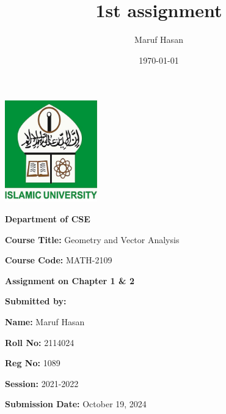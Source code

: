 \documentclass{article}
\title{1st assignment}
\author{Maruf Hasan}
\date{\today}
\begin{document}
\begin{titlepage}
    
    \begin{center}
        \vspace{2cm}
        \includegraphics[width=0.3\textwidth]{IU logo.jpg}\par
        \vspace{0.5cm}
        {\huge\textbf{Department of CSE}}\par
        \vspace{1cm}
        {\Large\textbf{Course Title:} Geometry and Vector Analysis\par}   
        {\Large\textbf{Course Code:}  MATH-2109\par}
        \vspace{1cm}
        {\huge\textbf{Assignment on Chapter 1 \& 2}\par}
        \vspace{2cm}
        \Large\textbf{Submitted by:}\par
        \textbf{Name:} Maruf Hasan\par
        \textbf{Roll No:} 2114024\par
        \textbf{Reg No:} 1089\par
        \textbf{Session:} 2021-2022\par
        \vspace{2cm}
        \Large\textbf{Submission Date:} October 19, 2024\par
    \end{center}
\end{titlepage}

\newpage
\end{document}
